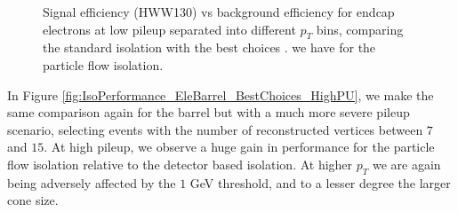 \begin{figure}[!htbp]
\begin{center}
\caption{Signal efficiency (HWW130) vs background efficiency for endcap electrons at low pileup
separated into different $p_{T}$ bins, comparing the standard isolation with the best choices .
we have for the particle flow isolation.}
\label{fig:IsoPerformance_EleEndcap_BestChoices_LowPU}
\end{center}
\end{figure}

\clearpage

In Figure \ref{fig:IsoPerformance_EleBarrel_BestChoices_HighPU}, we make the same comparison again for the
barrel but with a much more severe pileup scenario, selecting events with the number of reconstructed
vertices between $7$ and $15$. At high pileup, we observe a huge gain in performance for the particle
flow isolation relative to the detector based isolation. At higher $p_{T}$ we are again being 
adversely affected by the $1$ GeV threshold, and to a lesser degree the larger cone size. 




